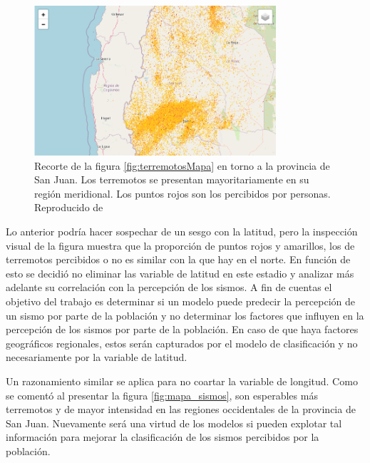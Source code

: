 \documentclass[a4paper]{report}
\begin{document}
\begin{figure}[!ht]
	\centering
	\includegraphics[width=0.8\textwidth]{sanJuan.png}
	\caption{Recorte de la figura \ref{fig:terremotosMapa} en torno a la provincia de San Juan.
	Los terremotos se presentan mayoritariamente en su región meridional.
	Los puntos rojos son los percibidos por personas.
	Reproducido de \cite{daniela_parada_ic-datasets-docencia_nodate}}
\label{fig:sanJuan}
\end{figure}

Lo anterior podría hacer sospechar de un sesgo con la latitud, pero la inspección visual de la figura muestra que la proporción de puntos rojos y amarillos, los de terremotos percibidos o no es similar con la que hay en el norte.
En función de esto se decidió no eliminar las variable de latitud en este estadio y analizar más adelante su correlación con la percepción de los sismos.
A fin de cuentas el objetivo del trabajo es determinar si un modelo puede predecir la percepción de un sismo por parte de la población y no determinar los factores que influyen en la percepción de los sismos por parte de la población.
En caso de que haya factores geográficos regionales, estos serán capturados por el modelo de clasificación y no necesariamente por la variable de latitud.

Un razonamiento similar se aplica para no coartar la variable de longitud.
Como se comentó al presentar la figura \ref{fig:mapa_sismos}, son esperables más terremotos y de mayor intensidad en las regiones occidentales de la provincia de San Juan.
Nuevamente será una virtud de los modelos si pueden explotar tal información para mejorar la clasificación de los sismos percibidos por la población.

\end{document}

